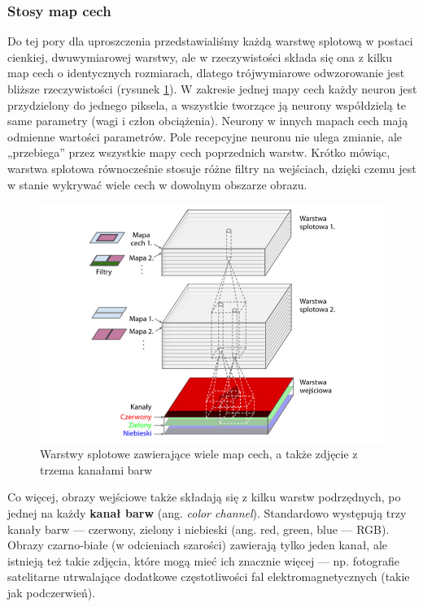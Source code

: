 \documentclass[12pt]{mwbk}
\theoremstyle{plain}
\theoremstyle{definition}
\theoremstyle{remark}
\newcommand\zrodlo[1]{\par\vspace{-3mm}{\small\textit{Źródło: }#1 }}
\begin{document}
\subsubsection{Stosy map cech}

Do tej pory dla uproszczenia przedstawialiśmy każdą warstwę splotową w postaci cienkiej, dwuwymiarowej warstwy, ale w rzeczywistości składa się ona z kilku map cech o identycznych rozmiarach, dlatego trójwymiarowe odwzorowanie jest bliższe rzeczywistości (rysunek \ref{fig:warstwy-kanaly}). W zakresie jednej mapy cech każdy neuron jest przydzielony do jednego piksela, a wszystkie tworzące ją neurony współdzielą te same parametry (wagi i człon obciążenia). Neurony w innych mapach cech mają odmienne wartości parametrów. Pole recepcyjne neuronu nie ulega zmianie, ale „przebiega” przez
wszystkie mapy cech poprzednich warstw. Krótko mówiąc, warstwa splotowa równocześnie stosuje
różne filtry na wejściach, dzięki czemu jest w stanie wykrywać wiele cech w dowolnym obszarze obrazu.

\begin{figure}[!h]
	\centering
	\includegraphics[width=\linewidth]{rys/warstwy_cnn_kanaly.png}
	\caption{Warstwy splotowe zawierające wiele map cech, a także zdjęcie z trzema kanałami barw}
	\zrodlo{\cite{geron}}
	\label{fig:warstwy-kanaly}
\end{figure}

Co więcej, obrazy wejściowe także składają się z kilku warstw podrzędnych, po jednej na każdy \textbf{kanał
barw} (ang. \emph{color channel}). Standardowo występują trzy kanały barw — czerwony, zielony i niebieski
(ang. red, green, blue — RGB). Obrazy czarno-białe (w odcieniach szarości) zawierają tylko jeden
kanał, ale istnieją też takie zdjęcia, które mogą mieć ich znacznie więcej — np. fotografie satelitarne
utrwalające dodatkowe częstotliwości fal elektromagnetycznych (takie jak podczerwień).
\end{document}

